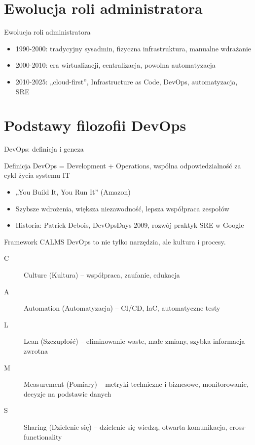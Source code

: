\documentclass[aspectratio=169]{beamer}
\begin{document}
\section{Ewolucja roli administratora}
\begin{frame}{Ewolucja roli administratora}
\begin{itemize}
  \item 1990-2000: tradycyjny sysadmin, fizyczna infrastruktura, manualne wdrażanie
  \item 2000-2010: era wirtualizacji, centralizacja, powolna automatyzacja
  \item 2010-2025: „cloud-first”, Infrastructure as Code, DevOps, automatyzacja, SRE
\end{itemize}
\begin{center}
\end{center}
\end{frame}

\section{Podstawy filozofii DevOps}
\begin{frame}{DevOps: definicja i geneza}
\begin{alertblock}{Definicja}
DevOps = Development + Operations, wspólna odpowiedzialność za cykl życia systemu IT
\end{alertblock}
\begin{itemize}
  \item „You Build It, You Run It” (Amazon)
  \item Szybsze wdrożenia, większa niezawodność, lepsza współpraca zespołów
  \item Historia: Patrick Debois, DevOpsDays 2009, rozwój praktyk SRE w Google
\end{itemize}
\end{frame}

\begin{frame}{Framework CALMS}
DevOps to nie tylko narzędzia, ale kultura i procesy.
\begin{description}
    \item[C] Culture (Kultura) -- współpraca, zaufanie, edukacja
    \item[A] Automation (Automatyzacja) -- CI/CD, IaC, automatyczne testy
    \item[L] Lean (Szczupłość) -- eliminowanie waste, małe zmiany, szybka informacja zwrotna
    \item[M] Measurement (Pomiary) -- metryki techniczne i biznesowe, monitorowanie, decyzje na podstawie danych
    \item[S] Sharing (Dzielenie się) -- dzielenie się wiedzą, otwarta komunikacja, cross-functionality
\end{description}
\end{frame}
\end{document}
